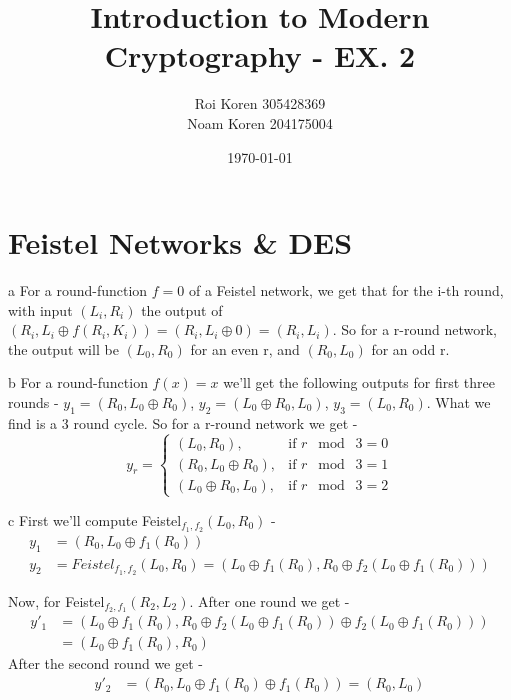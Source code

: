 \documentclass{article}
\begin{document}
\title{Introduction to Modern Cryptography - EX. 2}
\author{Roi Koren 305428369\\ Noam Koren 204175004}
\date{\today}
\maketitle
\newpage
{}

\section{Feistel Networks \& DES}
\begin{paragraph}
	a For a round-function $f = 0$ of a Feistel network, we get that for the i-th round, with
	input $(L_i, R_i)$ the output of $(R_i, L_i\oplus f(R_i, K_i)) = (R_i, L_i\oplus 0) = 
	(R_i, L_i)$. So for a r-round network, the output will be $(L_0, R_0)$ for an even r, and
	$(R_0, L_0)$ for an odd r.
\end{paragraph}

\begin{paragraph}
	b For a round-function $f(x) = x$ we'll get the following outputs for first three rounds - 
	$y_1 = (R_0, L_0\oplus R_0)$, $y_2 = (L_0\oplus R_0, L_0)$, $y_3 = (L_0, R_0)$. What we find
	is a 3 round cycle. So for a r-round network we get -
	\begin{equation*}
	y_r = 
		\begin{cases}
			(L_0, R_0), & \mbox{if } r \;\bmod\; 3 = 0 \\
			(R_0, L_0\oplus R_0), & \mbox{if } r \;\bmod\; 3 = 1 \\
			(L_0\oplus R_0, L_0), & \mbox{if } r \;\bmod\; 3 = 2 
		\end{cases}	
	\end{equation*}
\end{paragraph}

\begin{paragraph}
	c First we'll compute Feistel$_{f_1,f_2}(L_0, R_0)$ -
	\begin{align*}
		y_1 &= (R_0, L_0\oplus f_1(R_0)) \\
		y_2 &= {Feistel}_{f_1,f_2}(L_0, R_0) = (L_0\oplus f_1(R_0), R_0\oplus f_2(L_0\oplus f_1(R_0)))
	\end{align*}
	
	Now, for Feistel$_{f_2,f_1}(R_2, L_2)$. After one round we get - 
	\begin{align*}
		y'_1 &= (L_0\oplus f_1(R_0), R_0\oplus f_2(L_0\oplus f_1(R_0))\oplus f_2(L_0\oplus f_1(R_0))) \\
	  &= (L_0\oplus f_1(R_0), R_0)
	\end{align*}
	After the second round we get - 
	\begin{align*}
		y'_2 &= (R_0, L_0\oplus f_1(R_0) \oplus f_1(R_0)) = (R_0, L_0)
	\end{align*}
\end{paragraph}
\end{document}
